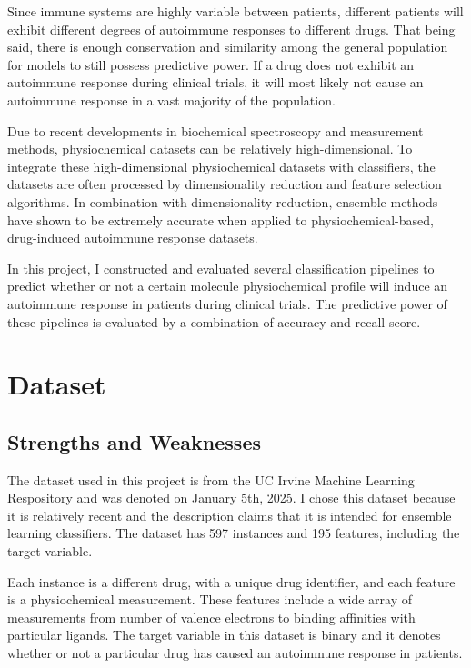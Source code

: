 \documentclass{article}
\begin{document}
Since immune systems are highly variable between patients, different patients will exhibit different degrees of autoimmune responses to different drugs. That being said, there is enough conservation and similarity among the general population for models to still possess predictive power. If a drug does not exhibit an autoimmune response during clinical trials, it will most likely not cause an autoimmune response in a vast majority of the population.%

Due to recent developments in biochemical spectroscopy and measurement methods, physiochemical datasets can be relatively high-dimensional. To integrate these high-dimensional physiochemical datasets with classifiers, the datasets are often processed by dimensionality reduction and feature selection algorithms. In combination with dimensionality reduction, ensemble methods have shown to be extremely accurate when applied to physiochemical-based, drug-induced autoimmune response datasets.

In this project, I constructed and evaluated several classification pipelines to predict whether or not a certain molecule physiochemical profile will induce an autoimmune response in patients during clinical trials. The predictive power of these pipelines is evaluated by a combination of accuracy and recall score. 

\section{Dataset}

\subsection{Strengths and Weaknesses}

The dataset used in this project is from the UC Irvine Machine Learning Respository and was denoted on January 5th, 2025. I chose this dataset because it is relatively recent and the description claims that it is intended for ensemble learning classifiers. The dataset has 597 instances and 195 features, including the target variable. 

Each instance is a different drug, with a unique drug identifier, and each feature is a physiochemical measurement. These features include a wide array of measurements from number of valence electrons to binding affinities with particular ligands. The target variable in this dataset is binary and it denotes whether or not a particular drug has caused an autoimmune response in patients. 
\end{document}
